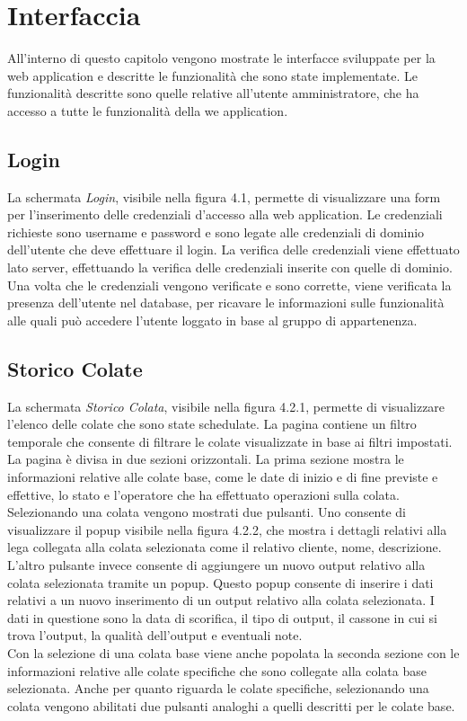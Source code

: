 \chapter{Interfaccia}
  \label{chapter_interfaccia}
  All'interno di questo capitolo vengono mostrate le interfacce sviluppate per la web application e descritte le funzionalità
  che sono state implementate. Le funzionalità descritte sono quelle relative all'utente amministratore, che ha accesso a tutte
  le funzionalità della we application.
  \section{Login}
  La schermata \textit{Login}, visibile nella figura 4.1, permette di visualizzare una form per l'inserimento delle 
  credenziali d'accesso alla web application. Le credenziali richieste sono username e password e sono legate alle credenziali
  di dominio dell'utente che deve effettuare il login. La verifica delle credenziali viene effettuato lato server, effettuando
  la verifica delle credenziali inserite con quelle di dominio. Una volta che le credenziali vengono verificate e sono
  corrette, viene verificata la presenza dell'utente nel database, per ricavare le informazioni sulle funzionalità
  alle quali può accedere l'utente loggato in base al gruppo di appartenenza.
  \section{Storico Colate}
  La schermata \textit{Storico Colata}, visibile nella figura 4.2.1, permette di visualizzare l'elenco delle colate che sono
  state schedulate. La pagina contiene un filtro temporale che consente di filtrare le colate visualizzate in base ai filtri
  impostati. La pagina è divisa in due sezioni orizzontali. La prima sezione mostra le informazioni relative alle colate base,
  come le date di inizio e di fine previste e effettive, lo stato e l'operatore che ha effettuato operazioni sulla colata.
  Selezionando una colata vengono mostrati due pulsanti. Uno consente di visualizzare il popup visibile nella figura 4.2.2,
  che mostra i dettagli relativi alla lega collegata alla colata selezionata come il relativo cliente, nome, descrizione. 
  L'altro pulsante invece consente di aggiungere un nuovo output relativo alla colata selezionata tramite un popup. 
  Questo popup consente di inserire i dati relativi a un nuovo inserimento di un output relativo alla
  colata selezionata. I dati in questione sono la data di scorifica, il tipo di output, il cassone in cui si trova l'output,
  la qualità dell'output e eventuali note.\\
  Con la selezione di una colata base viene anche popolata la seconda sezione con le informazioni relative alle colate specifiche
  che sono collegate alla colata base selezionata. Anche per quanto riguarda le colate specifiche, selezionando 
  una colata vengono abilitati due pulsanti analoghi a quelli descritti per le colate base.
